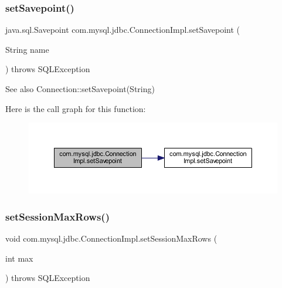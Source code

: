 \subsubsection{\texorpdfstring{set\+Savepoint()}{setSavepoint()}\hspace{0.1cm}{\footnotesize\ttfamily [2/2]}}
{\footnotesize\ttfamily java.\+sql.\+Savepoint com.\+mysql.\+jdbc.\+Connection\+Impl.\+set\+Savepoint (\begin{DoxyParamCaption}\item[{String}]{name }\end{DoxyParamCaption}) throws S\+Q\+L\+Exception}

\begin{DoxySeeAlso}{See also}
Connection\+::set\+Savepoint(\+String) 
\end{DoxySeeAlso}
Here is the call graph for this function\+:\nopagebreak
\begin{figure}[H]
\begin{center}
\leavevmode
\includegraphics[width=350pt]{classcom_1_1mysql_1_1jdbc_1_1_connection_impl_a50c5912b1869b1ee14920da16cf3259b_cgraph}
\end{center}
\end{figure}
\mbox{\label{classcom_1_1mysql_1_1jdbc_1_1_connection_impl_abdb4abb6fabad5cd48ac8b4d4e9c37cd}} 
\subsubsection{\texorpdfstring{set\+Session\+Max\+Rows()}{setSessionMaxRows()}}
{\footnotesize\ttfamily void com.\+mysql.\+jdbc.\+Connection\+Impl.\+set\+Session\+Max\+Rows (\begin{DoxyParamCaption}\item[{int}]{max }\end{DoxyParamCaption}) throws S\+Q\+L\+Exception}

